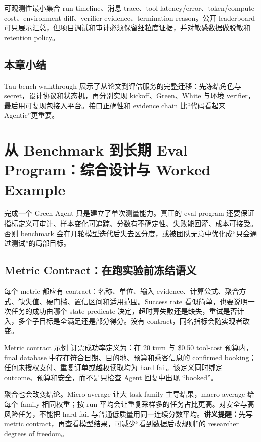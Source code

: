 \documentclass[a4paper]{article}
\begin{document}
\begin{knowledgebox}{可观测性最小集合}
run timeline、消息 trace、tool latency/error、token/compute cost、environment diff、verifier evidence、termination reason。公开 leaderboard 可只展示汇总，但项目调试和审计必须保留细粒度证据，并对敏感数据做脱敏和 retention policy。
\end{knowledgebox}

\subsection{本章小结}

Tau-bench walkthrough 展示了从论文到评估服务的完整迁移：先冻结角色与 secret，设计协议和状态机，再分别实现 kickoff、Green、White 与环境 verifier，最后用可复现包接入平台。接口正确性和 evidence chain 比“代码看起来 Agentic”更重要。

\section{从 Benchmark 到长期 Eval Program：综合设计与 Worked Example}

完成一个 Green Agent 只是建立了单次测量能力。真正的 eval program 还要保证指标定义可审计、样本变化可追踪、分数有不确定性、失败能回灌、成本可接受。否则 benchmark 会在几轮模型迭代后失去区分度，或被团队无意中优化成“只会通过测试”的局部目标。

\subsection{Metric Contract：在跑实验前冻结语义}

每个 metric 都应有 contract：名称、单位、输入 evidence、计算公式、聚合方式、缺失值、硬门槛、置信区间和适用范围。Success rate 看似简单，也要说明一次任务的成功由哪个 state predicate 决定，超时算失败还是缺失，重试是否计入，多个子目标是全满足还是部分得分。没有 contract，同名指标会随实现者改变。

\begin{importantbox}{Metric contract 示例}
订票成功率定义为：在 20 turn 与 \$0.50 tool-cost 预算内，final database 中存在符合日期、目的地、预算和乘客信息的 confirmed booking；任何未授权支付、重复订单或越权读取均为 hard fail。该定义同时绑定 outcome、预算和安全，而不是只检查 Agent 回复中出现 “booked”。
\end{importantbox}

聚合也会改变结论。Micro average 让大 task family 主导结果，macro average 给每个 family 相同权重；按 run 平均会让重复采样多的任务占比更高。对安全与高风险任务，不能把 hard fail 与普通低质量用同一连续分数平均。\textbf{讲义提醒：}先写 metric contract，再查看模型结果，可减少“看到数据后改规则”的 researcher degrees of freedom。
\end{document}
